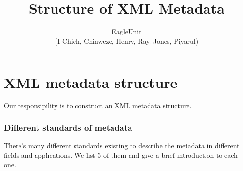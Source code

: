 \documentclass[a4paper]{article} %
\begin{document}

\title{Structure of XML Metadata}
\author{EagleUnit \\ (I-Chieh, Chinweze, Henry, Ray, Jones, Piyarul)} 

\maketitle                     %





\section*{XML metadata structure}
\label{sec:abs}


Our responsipility is to construct an XML metadata structure.



\subsubsection{Different standards of metadata}
\label{sec:mets}
There's many different standards existing to describe the metadata in different fields and applications. We list 5 of them and give a brief introduction to each one.
\end{document}
